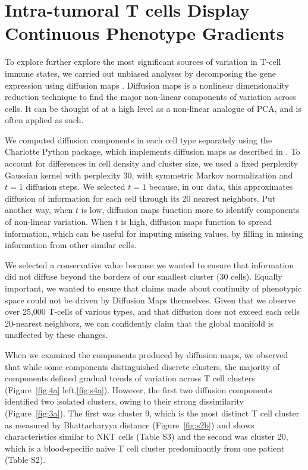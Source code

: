 \section{Intra-tumoral T cells Display Continuous Phenotype Gradients}

To explore further explore the most significant sources of variation in T-cell immune states, we carried out unbiased analyses by decomposing the gene expression using diffusion maps \citep{Coifman2005,Haghverdi2015,Haghverdi2016,Moignard2015,Setty2016}.
Diffusion maps is a nonlinear dimensionality reduction technique to find the major non-linear components of variation across cells.
It can be thought of at a high level as a non-linear analogue of PCA, and is often applied as such. %

We computed diffusion components in each cell type separately using the Charlotte Python package, which implements diffusion maps as described in \citep{Coifman2005}.
To account for differences in cell density and cluster size, we used a fixed perplexity Gaussian kernel with perplexity 30, with symmetric Markov normalization and $t=1$ diffusion steps.
We selected $t=1$ because, in our data, this approximates diffusion of information for each cell through its 20 nearest neighbors. 
Put another way, when $t$ is low, diffusion maps function more to identify components of non-linear variation. When $t$ is high, diffusion maps function to spread information, which can be useful for imputing missing values, by filling in missing information from other similar cells. 

We selected a conservative value because we wanted to ensure that information did not diffuse beyond the borders of our smallest cluster (30 cells).
Equally important, we wanted to ensure that claims made about continuity of phenotypic space could not be driven by Diffusion Maps themselves.
Given that we observe over 25,000 T-cells of various types, and that diffusion does not exceed each cells 20-nearest neighbors, we can confidently claim that the global manifold is unaffected by these changes. 

When we examined the components produced by diffusion maps, we observed that while some components distinguished discrete clusters, the majority of components defined gradual trends of variation across T cell clusters (Figure~\ref{fig:4a} left,\ref{fig:s4a}).
However, the first two diffusion components identified two isolated clusters, owing to their strong dissimilarity (Figure~\ref{fig:3a}). 
The first was cluster 9, which is the most distinct T cell cluster as measured by Bhattacharyya distance (Figure~\ref{fig:s2b}) and shows characteristics similar to NKT cells (Table S3) and the second was cluster 20, which is a blood-specific naive T cell cluster predominantly from one patient (Table S2).

